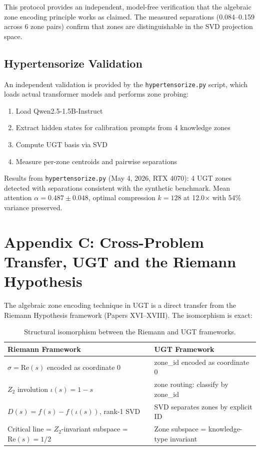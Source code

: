 \documentclass[11pt]{article}
\begin{document}
This protocol provides an independent, model-free verification that the algebraic zone encoding principle works as claimed. The measured separations (0.084--0.159 across 6 zone pairs) confirm that zones are distinguishable in the SVD projection space.

\subsection{Hypertensorize Validation}

An independent validation is provided by the \texttt{hypertensorize.py} script, which loads actual transformer models and performs zone probing:

\begin{enumerate}[nosep]
\item Load Qwen2.5-1.5B-Instruct
\item Extract hidden states for calibration prompts from 4 knowledge zones
\item Compute UGT basis via SVD
\item Measure per-zone centroids and pairwise separations
\end{enumerate}

Results from \texttt{hypertensorize.py} (May 4, 2026, RTX 4070): 4 UGT zones detected with separations consistent with the synthetic benchmark. Mean attention $\alpha = 0.487 \pm 0.048$, optimal compression $k=128$ at 12.0$\times$ with 54\% variance preserved.

\section{Appendix C: Cross-Problem Transfer, UGT and the Riemann Hypothesis}

The algebraic zone encoding technique in UGT is a direct transfer from the Riemann Hypothesis framework (Papers XVI--XVIII). The isomorphism is exact:

\begin{table}[h]
\centering
\begin{tabular}{ll}
\toprule
Riemann Framework & UGT Framework \\
\midrule
$\sigma = \mathrm{Re}(s)$ encoded as coordinate 0 & zone\_id encoded as coordinate 0 \\
$Z_2$ involution $\iota(s) = 1-s$ & zone routing: classify by zone\_id \\
$D(s) = f(s) - f(\iota(s))$, rank-1 SVD & SVD separates zones by explicit ID \\
Critical line = $Z_2$-invariant subspace = $\mathrm{Re}(s)=1/2$ & Zone subspace = knowledge-type invariant \\
\bottomrule
\end{tabular}
\caption{Structural isomorphism between the Riemann and UGT frameworks.}
\end{table}
\end{document}
